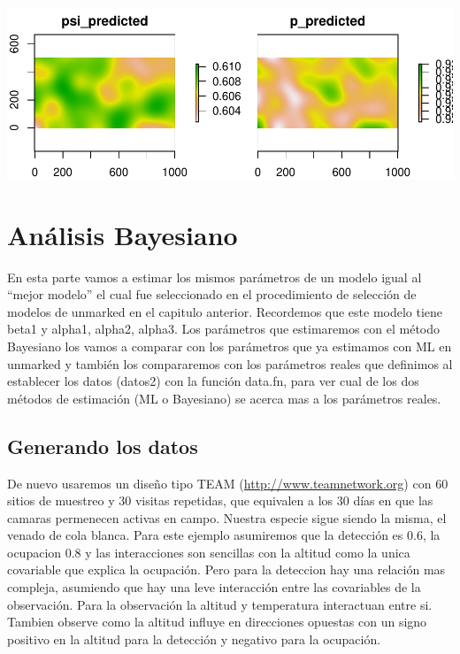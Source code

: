 \documentclass[]{book}
\begin{document}
\includegraphics{Simul-Machalilla-book_files/figure-latex/spatial2-1.pdf}

\chapter{Análisis Bayesiano}\label{bayesian}

En esta parte vamos a estimar los mismos parámetros de un modelo igual
al ``mejor modelo'' el cual fue seleccionado en el procedimiento de
selección de modelos de unmarked en el capitulo anterior. Recordemos que
este modelo tiene beta1 y alpha1, alpha2, alpha3. Los parámetros que
estimaremos con el método Bayesiano los vamos a comparar con los
parámetros que ya estimamos con ML en unmarked y también los
compararemos con los parámetros reales que definimos al establecer los
datos (datos2) con la función data.fn, para ver cual de los dos métodos
de estimación (ML o Bayesiano) se acerca mas a los parámetros reales.

\section{Generando los datos}\label{generando-los-datos-1}

De nuevo usaremos un diseño tipo TEAM (\url{http://www.teamnetwork.org})
con 60 sitios de muestreo y 30 visitas repetidas, que equivalen a los 30
días en que las camaras permenecen activas en campo. Nuestra especie
sigue siendo la misma, el venado de cola blanca. Para este ejemplo
asumiremos que la detección es 0.6, la ocupacion 0.8 y las interacciones
son sencillas con la altitud como la unica covariable que explica la
ocupación. Pero para la deteccion hay una relación mas compleja,
asumiendo que hay una leve interacción entre las covariables de la
observación. Para la observación la altitud y temperatura interactuan
entre si. Tambien observe como la altitud influye en direcciones
opuestas con un signo positivo en la altitud para la detección y
negativo para la ocupación.
\end{document}
